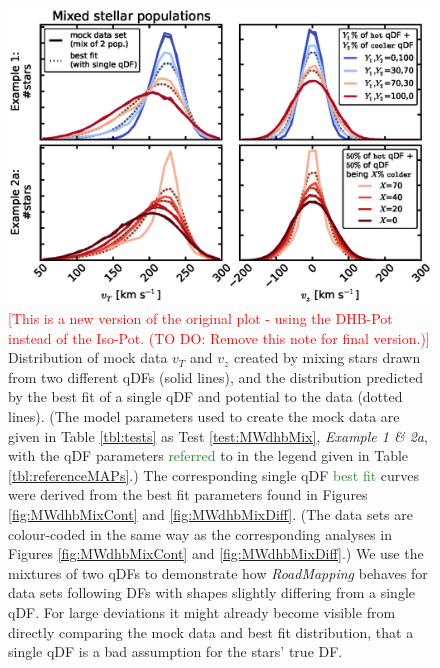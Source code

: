 \documentclass[iop,revtex4]{emulateapj}
\newcommand{\RM}{{\sl RoadMapping}}
\newcommand{\NEW}[1]{\textcolor{ForestGreen}{#1}}
\newcommand{\NOTE}[1]{\textcolor{Red}{#1}}
\newcommand{\OLD}[1]{}
\begin{document}
\begin{figure}[!htbp]
\centering
\includegraphics[width=\columnwidth]{figs/MWdhbMix_mockdata_residuals.eps}
\caption{\NOTE{[This is a new version of the original plot - using the DHB-Pot instead of the Iso-Pot. (TO DO: Remove this note for final version.)]} Distribution of mock data $v_T$ and $v_z$ created by mixing stars drawn from two different qDFs (solid lines), and the distribution predicted by the best fit of a single qDF and potential to the data (dotted lines). (The model parameters used to create the mock data are given in Table \ref{tbl:tests} as Test \ref{test:MWdhbMix}, \emph{Example 1 \& 2a}, with the qDF parameters \OLD{refereed}\NEW{referred} to in the legend given in Table \ref{tbl:referenceMAPs}.) The corresponding single qDF \NEW{best fit}\OLD{best-fit} curves were derived from the best fit parameters found in Figures \ref{fig:MWdhbMixCont} and \ref{fig:MWdhbMixDiff}. (The data sets are colour-coded in the same way as the corresponding analyses in Figures  \ref{fig:MWdhbMixCont} and \ref{fig:MWdhbMixDiff}.) We use the mixtures of two qDFs to demonstrate how \RM{} behaves for data sets following DFs with shapes slightly differing from a single qDF. For large deviations it might already become visible from directly comparing the mock data and best fit distribution, that a single qDF is a bad assumption for the stars' true DF.}
\label{fig:MWdhbMix_mockdata_residuals}
\end{figure}
\end{document}
